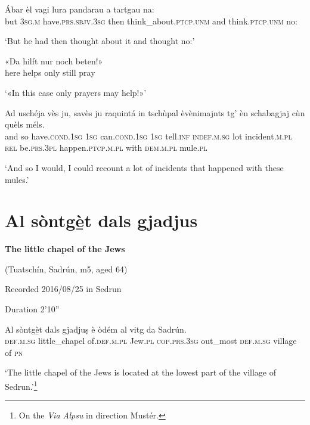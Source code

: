 \begin{linenumbers}
\gll   Ábar èl vagi lura pandarau a tartgau na: \\
but \textsc{3sg.m} have.\textsc{prs.sbjv.3sg} then think\_about.\textsc{ptcp.unm} and think.\textsc{ptcp.unm} no: \\
\end{linenumbers}
\medskip
\glt `But he had then thought about it and thought no:'
\medskip

\begin{linenumbers}
\gll«Da hilft nur noch beten!»\footnotemark\\
here helps only still pray\\
\end{linenumbers}
\medskip
\glt `«In this case only prayers may help!»'
\medskip

\begin{linenumbers}
\gll  Ad uschéja vès ju, savès ju raquintá in tschùpal èvènimajnts tg’ èn schabagjaj cùn quèls méls.  \\
and so have.\textsc{cond.1sg} \textsc{1sg} can.\textsc{cond.1sg} \textsc{1sg} tell.\textsc{inf} \textsc{indef.m.sg} lot incident.\textsc{m.pl} \textsc{rel} be.\textsc{prs.3pl} happen.\textsc{ptcp.m.pl} with \textsc{dem.m.pl} mule.\textsc{pl}\\
\end{linenumbers}
\medskip
\glt `And so I would, I could recount a lot of incidents that happened with these mules.'
\medskip

\section{Al sòntgè̱t dals gjadjus}\label{sec:8.8}

\textbf{The little chapel of the Jews}

\noindent
(Tuatschín, Sadrún, m5, aged 64)

\noindent
Recorded 2016/08/25 in Sedrun

\noindent
Duration 2'10''

\bigskip


\begin{linenumbers}
\gll Al sòntgè̱t dals gjadjuṣ è òdém al vitg da Sadrún.\\
 \textsc{def.m.sg} little\_chapel of.\textsc{def.m.pl} Jew.\textsc{pl} \textsc{cop.prs.3sg}  out\_most \textsc{def.m.sg} village of \textsc{pn} \\
\end{linenumbers}
\medskip
\glt `The little chapel of the Jews is located at the lowest part of the village of Sedrun.'\footnote{On the \textit{Via Alpsu} in direction Mustér.}
\medskip


